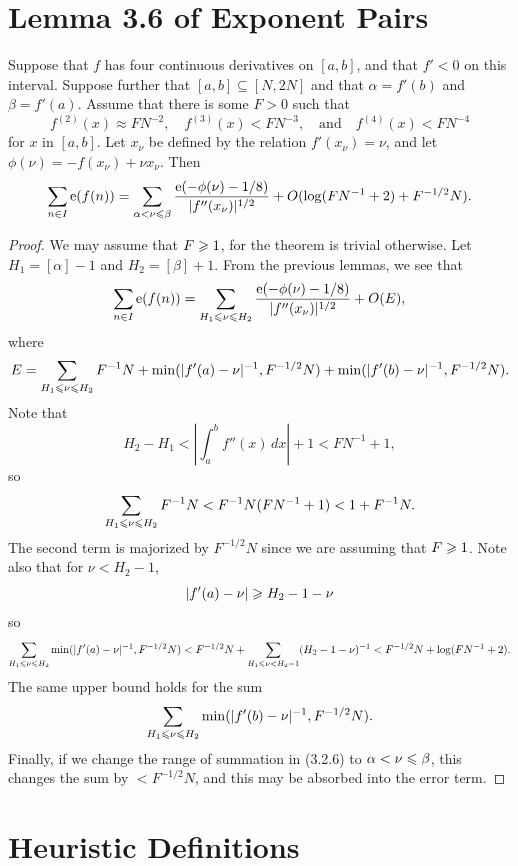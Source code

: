 \section{Lemma 3.6 of Exponent Pairs}

\begin{lemma}
Suppose that $f$ has four continuous derivatives on $[a,b]$, and that $f' < 0$ on this interval. Suppose further that $[a,b] \subseteq [N,2N]$ and that $\alpha = f'(b)$ and $\beta = f'(a)$. Assume that there is some $F > 0$ such that
\[
f^{(2)}(x) \approx F N^{-2}, \quad f^{(3)}(x) < F N^{-3}, \quad \text{and} \quad f^{(4)}(x) < F N^{-4}
\]
for $x$ in $[a,b]$. Let $x_\nu$ be defined by the relation $f'(x_\nu) = \nu$, and let $\phi(\nu) = -f(x_\nu) + \nu x_\nu$. Then
\[
\sum_{n \in I} \operatorname{e} \! \left( f(n) \right) = \sum_{\alpha < \nu \leqslant \beta} \frac{\operatorname{e} \! \left( -\phi(\nu) - 1/8 \right)}{|f''(x_\nu)|^{1/2}} + O(\log(F N^{-1} + 2) + F^{-1/2} N).
\]
\end{lemma}

\begin{proof}
We may assume that $F \geqslant 1$, for the theorem is trivial otherwise. Let $H_1 = [\alpha] - 1$ and $H_2 = [\beta] + 1$. From the previous lemmas, we see that
\[
\sum_{n \in I} \operatorname{e} \! \left( f(n) \right) = \sum_{H_1 \leqslant \nu \leqslant H_2} \frac{\operatorname{e} \! \left( -\phi(\nu) - 1/8 \right)}{|f''(x_\nu)|^{1/2}} + O(E),
\]
where
\[
E = \sum_{H_1 \leqslant \nu \leqslant H_2} F^{-1} N + \min(|f'(a) - \nu|^{-1}, F^{-1/2} N) + \min(|f'(b) - \nu|^{-1}, F^{-1/2} N).
\]
Note that
\[
H_2 - H_1 < \left| \int_a^b f''(x) \, dx \right| + 1 < F N^{-1} + 1,
\]
so
\[
\sum_{H_1 \leqslant \nu \leqslant H_2} F^{-1} N < F^{-1} N (F N^{-1} + 1) < 1 + F^{-1} N.
\]
The second term is majorized by $F^{-1/2} N$ since we are assuming that $F \geqslant 1$. Note also that for $\nu < H_2 - 1$,
\[
|f'(a) - \nu| \geqslant H_2 - 1 - \nu
\]
so
\[
\sum_{H_1 \leqslant \nu \leqslant H_2} \min(|f'(a) - \nu|^{-1}, F^{-1/2} N) < F^{-1/2} N + \sum_{H_1 \leqslant \nu < H_2 -1} (H_2 - 1 - \nu)^{-1} < F^{-1/2} N + \log(F N^{-1} + 2).
\]
The same upper bound holds for the sum
\[
\sum_{H_1 \leqslant \nu \leqslant H_2} \min(|f'(b) - \nu|^{-1}, F^{-1/2} N).
\]
Finally, if we change the range of summation in (3.2.6) to $\alpha < \nu \leqslant \beta$, this changes the sum by $< F^{-1/2} N$, and this may be absorbed into the error term.
\end{proof}

\section{Heuristic Definitions}

